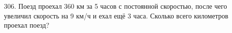 306. Поезд проехал 360 км за 5 часов с постоянной скоростью, после чего увеличил скорость на 9 км/ч и ехал ещё 3 часа. Сколько всего километров проехал поезд?\\
